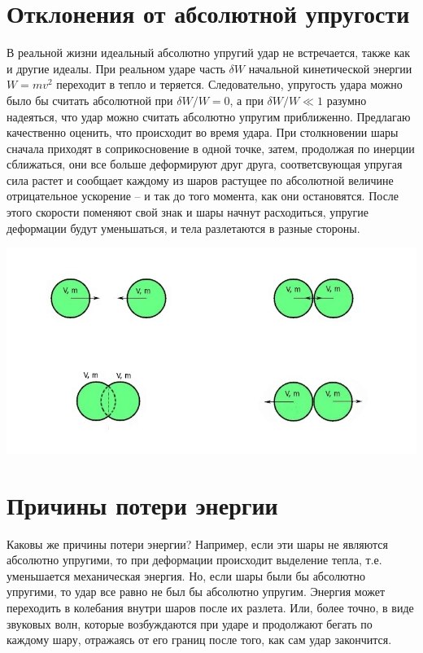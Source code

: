 \documentclass[a4paper]{article}
\begin{document}
\section{Отклонения от абсолютной упругости}
В реальной жизни идеальный абсолютно упругий удар не встречается, также как и другие идеалы. При реальном ударе часть $\delta W$ начальной кинетической энергии $W = mv^2$ переходит в тепло и теряется. Следовательно, упругость удара можно было бы считать абсолютной при $\delta W/W = 0$, а при $\delta W/W \ll 1$ разумно надеяться, что удар можно считать абсолютно упругим приближенно.
Предлагаю качественно оценить, что происходит во время удара. При столкновении шары сначала приходят в соприкосновение в одной точке, затем, продолжая по инерции сближаться, они все больше деформируют друг друга, соответсвующая упругая сила растет и сообщает каждому из шаров растущее по абсолютной величине отрицательное ускорение -- и так до того момента, как они остановятся. После этого скорости поменяют свой знак и шары начнут расходиться, упругие деформации будут уменьшаться, и тела разлетаются в разные стороны. 
\begin{center}
\includegraphics[scale=0.7]{vpv-image1.jpg}
\end{center}
\section{Причины потери энергии}
Каковы же причины потери энергии? Например, если эти шары не являются абсолютно упругими, то при деформации происходит выделение тепла, т.е. уменьшается механическая энергия. Но, если шары были бы абсолютно упругими, то удар все равно не был бы абсолютно упругим. Энергия может переходить в колебания внутри шаров после их разлета. Или, более точно, в виде звуковых волн, которые возбуждаются при ударе и продолжают бегать по каждому шару, отражаясь от его границ после того, как сам удар закончится.
\end{document}
